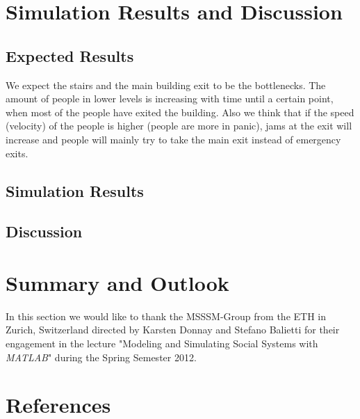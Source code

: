 \documentclass[11pt]{article}
\begin{document}
\section{Simulation Results and Discussion}

\subsection{Expected Results}

We expect the stairs and the main building exit to be the bottlenecks. The amount of people in lower levels is increasing with time until a certain point, when most of the people have exited the building. Also we think that if the speed (velocity) of the people is higher (people are more in panic), jams at the exit will increase and people will mainly try to take the main exit instead of emergency exits.

\subsection{Simulation Results}


\subsection{Discussion}


\section{Summary and Outlook}

In this section we would like to thank the MSSSM-Group from the ETH in Zurich, Switzerland directed by Karsten Donnay and Stefano Balietti for their engagement in the lecture "Modeling and Simulating Social Systems with \textit{MATLAB}" during the Spring Semester 2012.



\section{References}
\end{document}
